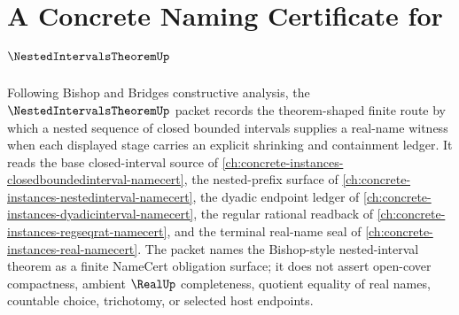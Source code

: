 \chapter{A Concrete Naming Certificate for $\NestedIntervalsTheoremUp$}
\label{ch:concrete-instances-nested-intervals-theorem-namecert}

Following Bishop and Bridges constructive analysis, the $\NestedIntervalsTheoremUp$ packet records the theorem-shaped finite route by which a nested sequence of closed bounded intervals supplies a real-name witness when each displayed stage carries an explicit shrinking and containment ledger. It reads the base closed-interval source of \autoref{ch:concrete-instances-closedboundedinterval-namecert}, the nested-prefix surface of \autoref{ch:concrete-instances-nestedinterval-namecert}, the dyadic endpoint ledger of \autoref{ch:concrete-instances-dyadicinterval-namecert}, the regular rational readback of \autoref{ch:concrete-instances-regseqrat-namecert}, and the terminal real-name seal of \autoref{ch:concrete-instances-real-namecert}. The packet names the Bishop-style nested-interval theorem as a finite NameCert obligation surface; it does not assert open-cover compactness, ambient $\RealUp$ completeness, quotient equality of real names, countable choice, trichotomy, or selected host endpoints.

